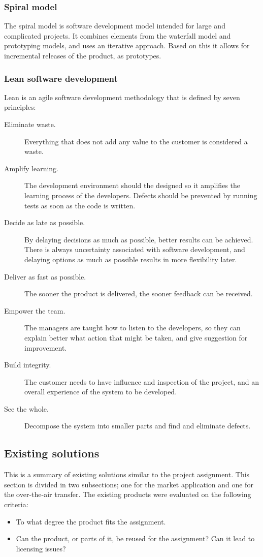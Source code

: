 \subsubsection{Spiral model}
The spiral model is software development model intended for large and complicated projects. It combines elements from the waterfall model and prototyping models, and uses an iterative approach. Based on this it allows for incremental releases of the product, as prototypes.

\subsubsection{Lean software development}
Lean is an agile software development methodology that is defined by seven principles:
\begin{description}
	\item[Eliminate waste.]{Everything that does not add any value to the customer is considered a waste.}
	\item[Amplify learning.]{The development environment should the designed so it amplifies the learning process of the developers. Defects should be prevented by running tests as soon as the code is written.}
	\item[Decide as late as possible.]{By delaying decisions as much as possible, better results can be achieved. There is always uncertainty associated with software development, and delaying options as much as possible results in more flexibility later.} 
	\item[Deliver as fast as possible.]{The sooner the product is delivered, the sooner feedback can be received.}
	\item[Empower the team.]{The managers are taught how to listen to the developers, so they can explain better what action that might be taken, and give suggestion for improvement.}
	\item[Build integrity.]{The customer needs to have influence and inspection of the project, and an overall experience of the system to be developed.}
	\item[See the whole.]{Decompose the system into smaller parts and find and eliminate defects.}
\end{description}

\subsection{Existing solutions}
This is a summary of existing solutions similar to the project assignment. This section is divided in two subsections; one for the market application and one for the over-the-air transfer. The existing products were evaluated on the following criteria:
\begin{itemize}
	\item{To what degree the product fits the assignment.}
	\item{Can the product, or parts of it, be reused for the assignment? Can it lead to licensing issues?}
\end{itemize}

